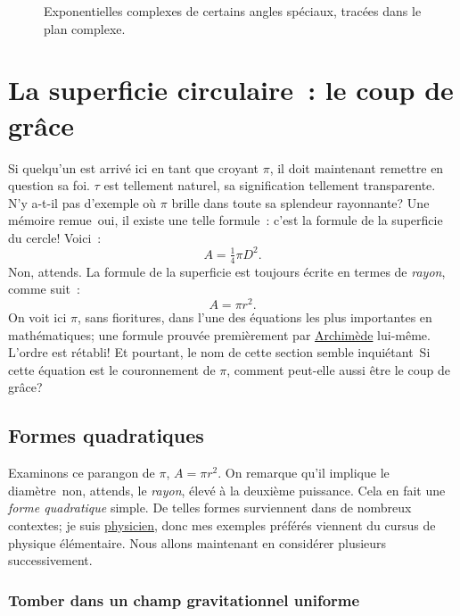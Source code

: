 \begin{figure}
\begin{center}
\end{center}
\caption{Exponentielles complexes de certains angles spéciaux, tracées dans le
plan complexe.\label{fig:tau_euler_circle}}
\end{figure}


\section{La superficie circulaire~: le coup de grâce} %
\label{sec:circular_area}

Si quelqu'un est arrivé ici en tant que croyant $\pi$, il doit maintenant
remettre en question sa foi. $\tau$ est tellement naturel, sa signification
tellement transparente. N'y a-t-il pas d'exemple où $\pi$ brille dans toute sa
splendeur rayonnante\ns? Une mémoire remue\textellipsis\ oui, il existe une telle
formule~: c'est la formule de la superficie du cercle\ns! Voici~:
\[ A = \tfrac{1}{4} \pi D^2. \]
Non, attends. La formule de la superficie est toujours écrite en termes de
\emph{rayon}, comme suit~:
\[ A = \pi r^2. \]
On voit ici $\pi$, sans fioritures, dans l'une des équations les plus
importantes en mathématiques\ns; une formule prouvée premièrement par
\href{https://fr.wikipedia.org/wiki/Archimède}{Archimède} lui-même. L'ordre est
rétabli\ns! Et pourtant, le nom de cette section semble inquiétant\textellipsis\
Si cette équation est le couronnement de $\pi$, comment peut-elle aussi être le
coup de grâce\ns?


  \subsection{Formes quadratiques} %
  \label{sec:quadratic_forms}

Examinons ce parangon de $\pi$, $A = \pi r^2$. On remarque qu'il implique
le diamètre\textellipsis\ non, attends, le \emph{rayon}, élevé à la deuxième puissance.
Cela en fait une \emph{forme quadratique} simple. De telles formes surviennent
dans de nombreux contextes\ns; je suis
\href{https://thesis.library.caltech.edu/1940/}{physicien}, donc mes exemples
préférés viennent du cursus de physique élémentaire. Nous allons maintenant en
considérer plusieurs successivement.

    \subsubsection{Tomber dans un champ gravitationnel uniforme} %
    \label{sec:falling_in_a_uniform_gravitational_field}

